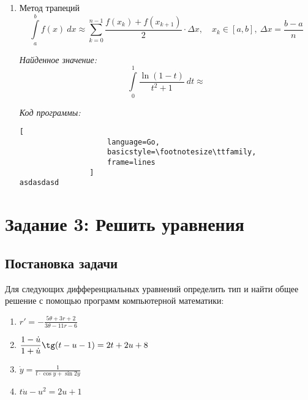 \documentclass[14pt, a4paper, titlepage, fleqn]{extarticle}
\begin{document}
\begin{enumerate}
                \textit{Код программы:}
                \begin{lstlisting}[
                    language=Go,
                    basicstyle=\footnotesize\ttfamily,
                    frame=lines
                ]
asdasdasd
                \end{lstlisting}
                
                \item Метод трапеций
                \[
                    \int\limits_a^b f(x) ~ dx \approx
                    \sum_{k=0}^{n-1} 
                    \frac{f\left( x_k \right) + f\left(x_{k+1}\right)}{2}
                    \cdot \Delta x,
                    \quad x_k \in [a, b], ~ \Delta x = \frac{b-a}{n}    
                \]

                \textit{Найденное значение:}
                \[
                    \int\limits_0^1 \frac{\ln(1-t)}{t^2+1} ~ dt \approx
                \]

                \textit{Код программы:}
                \begin{lstlisting}[
                    language=Go,
                    basicstyle=\footnotesize\ttfamily,
                    frame=lines
                ]
asdasdasd
                \end{lstlisting}
            \end{enumerate}

    \pagebreak

    \section{Задание 3: Решить уравнения}
        \subsection{Постановка задачи}
            Для следующих дифференциальных уравнений определить тип и найти
            общее решение с помощью программ компьютерной математики:
            \begin{enumerate}
                \item 
                \(
                    \displaystyle
                    r' = -\frac{5\theta + 3r + 2}{3\theta -11r-6}    
                \)

                \item 
                \(
                    \displaystyle
                    \frac{1-\dot{u}}{1+\dot{u}} \tg (t-u-1) = 2t+2u+8
                \)

                \item 
                \(
                    \displaystyle
                    \dot{y} = \frac{1}{t \cdot \cos{y} + \sin{2y}}
                \)
                
                \item 
                \(
                    \displaystyle
                    t\dot{u} - u^2=2u+1    
                \)
            \end{enumerate}
\end{document}
